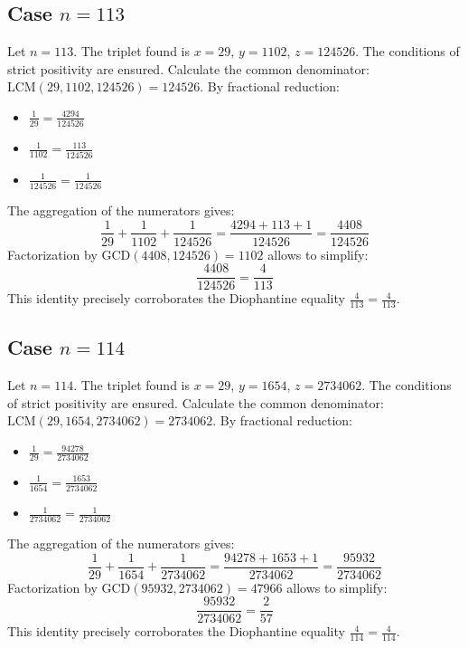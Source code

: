 \documentclass[11pt,a4paper]{article}
\begin{document}
\subsection{Case $n = 113$}
Let $n = 113$. The triplet found is $x = 29$, $y = 1102$, $z = 124526$.
The conditions of strict positivity are ensured.
Calculate the common denominator: $\text{LCM}(29, 1102, 124526) = 124526$.
By fractional reduction:
\begin{itemize}
    \item $\frac{1}{29} = \frac{4294}{124526}$
    \item $\frac{1}{1102} = \frac{113}{124526}$
    \item $\frac{1}{124526} = \frac{1}{124526}$
\end{itemize}
The aggregation of the numerators gives:
$$ \frac{1}{29} + \frac{1}{1102} + \frac{1}{124526} = \frac{4294 + 113 + 1}{124526} = \frac{4408}{124526} $$
Factorization by $\text{GCD}(4408, 124526) = 1102$ allows to simplify:
$$ \frac{4408}{124526} = \frac{4}{113} $$
This identity precisely corroborates the Diophantine equality $\frac{4}{113} = \frac{4}{113}$.

\subsection{Case $n = 114$}
Let $n = 114$. The triplet found is $x = 29$, $y = 1654$, $z = 2734062$.
The conditions of strict positivity are ensured.
Calculate the common denominator: $\text{LCM}(29, 1654, 2734062) = 2734062$.
By fractional reduction:
\begin{itemize}
    \item $\frac{1}{29} = \frac{94278}{2734062}$
    \item $\frac{1}{1654} = \frac{1653}{2734062}$
    \item $\frac{1}{2734062} = \frac{1}{2734062}$
\end{itemize}
The aggregation of the numerators gives:
$$ \frac{1}{29} + \frac{1}{1654} + \frac{1}{2734062} = \frac{94278 + 1653 + 1}{2734062} = \frac{95932}{2734062} $$
Factorization by $\text{GCD}(95932, 2734062) = 47966$ allows to simplify:
$$ \frac{95932}{2734062} = \frac{2}{57} $$
This identity precisely corroborates the Diophantine equality $\frac{4}{114} = \frac{4}{114}$.
\end{document}
